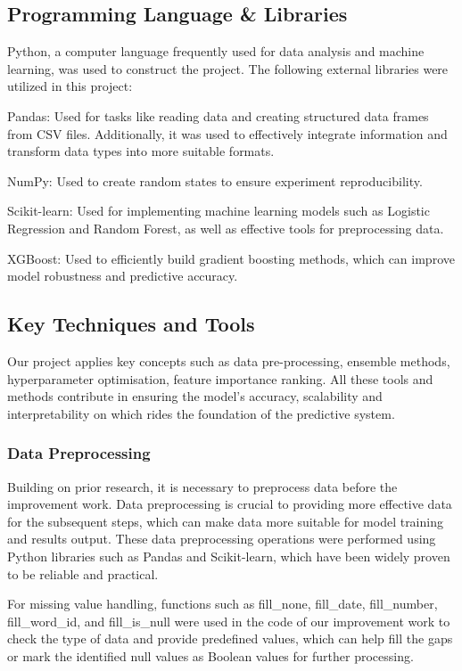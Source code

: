 \documentclass[conference]{IEEEtran}
\begin{document}
\subsection{Programming Language \& Libraries}
Python, a computer language frequently used for data analysis and machine learning, was used to construct the project. The following external libraries were utilized in this project:

Pandas: Used for tasks like reading data and creating structured data frames from CSV files. Additionally, it was used to effectively integrate information and transform data types into more suitable formats. 

NumPy: Used to create random states to ensure experiment reproducibility.

Scikit-learn: Used for implementing machine learning models such as Logistic Regression and Random Forest, as well as effective tools for preprocessing data. 

XGBoost: Used to efficiently build gradient boosting methods, which can improve model robustness and predictive accuracy.


\subsection{Key Techniques and Tools}
Our project applies key concepts such as data pre-processing, ensemble methods, hyperparameter optimisation, feature importance ranking. All these tools and methods contribute in ensuring the model’s accuracy, scalability and interpretability on which rides the foundation of the predictive system.

\subsubsection{Data Preprocessing}
Building on prior research, it is necessary to preprocess data before the improvement work. Data preprocessing is crucial to providing more effective data for the subsequent steps, which can make data more suitable for model training and results output. These data preprocessing operations were performed using Python libraries such as Pandas and Scikit-learn, which have been widely proven to be reliable and practical. 

For missing value handling, functions such as fill\_none, fill\_date, fill\_number, fill\_word\_id, and fill\_is\_null were used in the code of our improvement work to check the type of data and provide predefined values, which can help fill the gaps or mark the identified null values as Boolean values for further processing.
\end{document}
